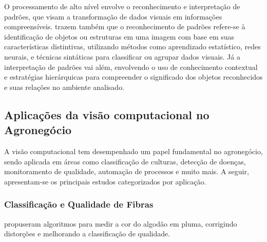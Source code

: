 O processamento de alto nível envolve o reconhecimento e interpretação de padrões, que visam a transformação de dados visuais em informações compreensíveis.  trazem também que o reconhecimento de padrões refere-se à identificação de objetos ou estruturas em uma imagem com base em suas características distintivas, utilizando métodos como aprendizado estatístico, redes neurais, e técnicas sintáticas para classificar ou agrupar dados visuais. Já a interpretação de padrões vai além, envolvendo o uso de conhecimento contextual e estratégias hierárquicas para compreender o significado dos objetos reconhecidos e suas relações no ambiente analisado.

\subsection{Aplicações da visão computacional no Agronegócio}

A visão computacional tem desempenhado um papel fundamental no agronegócio, sendo aplicada em áreas como classificação de culturas, detecção de doenças, monitoramento de qualidade, automação de processos e muito mais. A seguir, apresentam-se os principais estudos categorizados por aplicação.

\subsubsection{Classificação e Qualidade de Fibras}
\cite{li2023} propuseram algoritmos para medir a cor do algodão em pluma, corrigindo distorções e melhorando a classificação de qualidade.  

